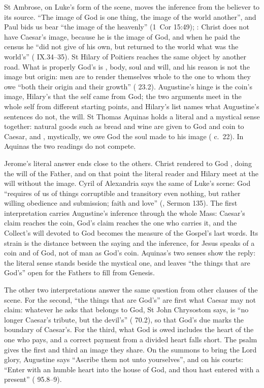 St Ambrose, on Luke's form of the scene, moves the inference from the believer
to its source. ``The image of God is one thing, the image of the world
another'', and Paul bids us
bear ``the image of the heavenly'' (1~Cor 15:49); : Christ does not have Caesar's image,
because he is the image of God, and when he paid the census he ``did not give
of his own, but returned to the world what was the world's''
( IX.34--35). St Hilary of Poitiers
reaches the same object by another road. What is properly God's is
, body, soul and will, and his reason is not
the image but origin: men are to render themselves whole to the one to whom
they owe ``both their origin and their growth'' ( 23.2). Augustine's hinge is the coin's image, Hilary's that the self
came from God; the two arguments meet in the whole self from different
starting points, and Hilary's list names what Augustine's sentences do not, the
will. St Thomas Aquinas holds a literal and a mystical sense together: natural
goods such as bread and wine are given to God and coin to Caesar, and
, mystically, we owe God the soul made to his image
( c.~22). In Aquinas the two readings do not compete.

Jerome's literal answer ends close to the others. Christ rendered to God
, doing the will of the Father, and on that
point the literal reader and Hilary meet at the will without the image. Cyril
of Alexandria says the same of Luke's scene: God ``requires of us of things
corruptible and transitory even nothing, but rather willing obedience and
submission; faith and love'' (, Sermon 135). The first
interpretation carries Augustine's inference through the whole Mass: Caesar's
claim reaches the coin, God's claim reaches the one who carries it, and the
Collect's will devoted to God becomes the measure of the Gospel's last words.
Its strain is the distance between the saying and the inference, for Jesus
speaks of a coin and of God, not of man as God's coin. Aquinas's two senses
show the reply: the literal sense stands beside the mystical one, and leaves
``the things that are God's'' open for the Fathers to fill from Genesis.

The other two interpretations answer the same question from other clauses of
the scene. For the second, ``the things that are God's'' are first what Caesar
may not claim: whatever he asks that belongs to God, St John Chrysostom says,
is ``no longer Caesar's tribute, but the devil's'' (
70.2), so that God's due marks the boundary of Caesar's. For the third, what God
is owed includes the heart of the one who pays, and a correct payment from a
divided heart falls short. The psalm gives the first and third an image they
share. On the summons to bring the Lord glory, Augustine says ``Ascribe them not
unto yourselves'', and on his courts: ``Enter with an humble heart into the
house of God, and thou hast entered with a present'' ( 95.8--9).

